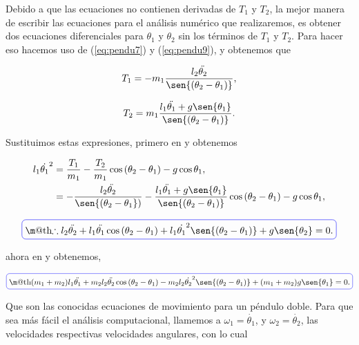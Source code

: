 \documentclass[a4paper,10pt]{article}
\makeatletter
\numberwithin{equation}{section}
\newcommand*{\boxcolor}{blue}
\renewcommand{\boxed}[1]{\textcolor{\boxcolor}{%
\tikz[baseline={([yshift=-1ex]current bounding box.center)}] \node [rectangle, minimum width=1ex,rounded corners,draw] {\normalcolor\m@th$\displaystyle#1$};}}
\makeatother
\begin{document}
Debido a que las ecuaciones no contienen derivadas de $T_1$ y $T_2$, la mejor manera 
de escribir las ecuaciones para el análisis numérico que realizaremos, es obtener 
dos ecuaciones diferenciales para $\theta_1$ y $\theta_2$ sin los términos de $T_1$
y $T_2$. Para hacer eso hacemos uso de (\ref{eq:pendu7}) y (\ref{eq:pendu9}), y 
obtenemos que 

\begin{equation}
 T_1 = - m_1 \frac{l_2\ddot{\theta_2}}{\sen{(\theta_2 - \theta_1)}},
\end{equation}

\begin{equation}
 T_2 = m_1 \frac{l_1 \ddot{\theta_1} + g \sen{\theta_1}}{\sen{(\theta_2 - \theta_1)}}.
\end{equation}

Sustituimos estas expresiones, primero en  y obtenemos 

\begin{align*}
 l_1 \dot{\theta_1}^2 &= \frac{T_1}{m_1} - \frac{T_2}{m_1}\cos{(\theta_2 - \theta_1)} - g \cos{\theta_1}, \\
		      &= - \frac{l_2\ddot{\theta_2}}{\sen{(\theta_2 - \theta_1})}
		         -   \frac{l_1 \ddot{\theta_1} + g \sen{\theta_1}}{\sen{(\theta_2 - \theta_1)}}\cos{(\theta_2 - \theta_1)}
		         - g \cos{\theta_1},
\end{align*}

\begin{equation}
 \boxed{\therefore l_2 \ddot{\theta_2} + l_1 \ddot{\theta_1}\cos{(\theta_2 - \theta_1)} 
 + l_1 \dot{\theta_1}^2\sen{(\theta_2 - \theta_1)} + g \sen{\theta_2} = 0.}
\end{equation}

ahora en  y obtenemos,

\begin{equation}
 \boxed{(m_1 + m_2) l_1 \ddot{\theta_1} + m_2 l_2 \ddot{\theta_2}\cos{(\theta_2 - \theta_1)}
 - m_2 l_2 \dot{\theta_2}^2 \sen{(\theta_2 - \theta_1)} + (m_1 + m_2)g\sen{\theta_1} = 0.}
\end{equation}

\vspace{.3cm}

Que son las conocidas ecuaciones de movimiento para un péndulo doble. Para que sea más
fácil el análisis computacional, llamemos a $\omega_1 = \dot{\theta_1}$, y 
$\omega_2 = \dot{\theta_2}$, las velocidades respectivas velocidades angulares,
con lo cual
\end{document}
